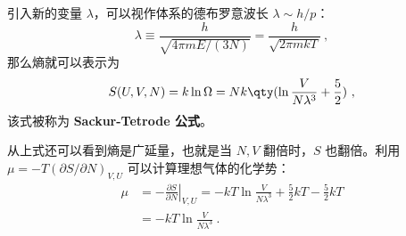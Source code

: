 引入新的变量 $\lambda$，可以视作体系的德布罗意波长 $\lambda\sim h/p$：
\begin{equation}
\lambda \equiv \frac{h}{\sqrt{4\pi mE/(3N)}} = \frac{h}{\sqrt{2\pi mkT}}~,
\end{equation}
那么熵就可以表示为
\begin{equation}\label{eq_IdeaS_2}
S(U, V, N) = k\ln \Omega  = Nk \qty(\ln \frac{V}{N\lambda^3} + \frac52)~,
\end{equation}
该式被称为 \textbf{Sackur-Tetrode 公式}。 

从上式还可以看到熵是广延量，也就是当 $N,V$ 翻倍时，$S$ 也翻倍。利用 $\mu=-T(\partial S/\partial N)_{V,U}$ 可以计算理想气体的化学势：
\begin{equation}
\begin{aligned}
\mu&=-\left.\frac{\partial S}{\partial N}\right|_{V,U}=-kT\ln \frac{V}{N\lambda^3}+\frac{5}{2}kT-\frac{5}{2}kT\\
&=-kT\ln \frac{V}{N\lambda^3}~.
\end{aligned}
\end{equation}
